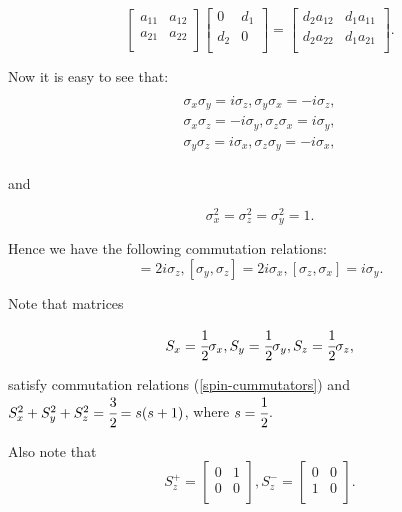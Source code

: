 \documentclass[main.tex]{subfiles}
\begin{document}
\begin{equation}
\begin{bmatrix}
    a_{11} &  a_{12} \\
    a_{21} & a_{22} \\
\end{bmatrix}
\begin{bmatrix}
    0 & d_1 \\
    d_2 & 0 \\
\end{bmatrix}
= \begin{bmatrix}
    d_2 a_{12} &  d_1 a_{11} \\
    d_2 a_{22} & d_1 a_{21} \\
\end{bmatrix}.
\end{equation}


Now it is easy to see that:
\begin{multline}\\
\sigma_x \sigma_y = i\sigma_z, \sigma_y\sigma_x = -i\sigma_z,\\
\sigma_x \sigma_z = -i\sigma_y, \sigma_z\sigma_x = i\sigma_y,\\
\sigma_y \sigma_z = i\sigma_x, \sigma_z\sigma_y = -i\sigma_x,\\
\end{multline}

and

\begin{equation}
\sigma_x^2 = \sigma_z^2 = \sigma_y^2 = 1.
\end{equation}

Hence we have the following commutation relations:
\begin{equation}
[\sigma_x, \sigma_y] = 2i\sigma_z, [\sigma_y, \sigma_z] = 2i\sigma_x, [\sigma_z, \sigma_x] = i\sigma_y.
\end{equation}

Note that matrices

\begin{equation}
S_x = \cfrac{1}{2}\sigma_x, S_y = \cfrac{1}{2}\sigma_y, S_z = \cfrac{1}{2}\sigma_z,
\end{equation}

satisfy commutation relations (\ref{spin-cummutators}) and $S^2_x + S^2_y + S^2_z = \cfrac{3}{2} = s(s + 1)$, where $s=\cfrac{1}{2}$.


Also note that
\begin{equation}
S^{+}_z = \begin{bmatrix}
    0 &  1 \\
    0 & 0 \\
\end{bmatrix},
S^{-}_z = \begin{bmatrix}
    0 &  0 \\
    1 & 0 \\
\end{bmatrix}.
\end{equation}
\end{document}
